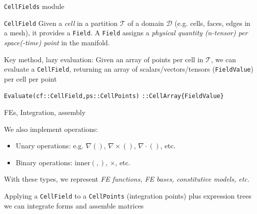 \begin{frame}{\texttt{CellFields} module}


\begin{block}{\texttt{CellField}}
  Given a \emph{cell} in a partition $\mathcal{T}$ of a domain $\mathcal{D}$ (e.g. cells, faces, edges in a mesh), it provides a \texttt{Field}. A \texttt{Field} assigns a \emph{physical quantity (n-tensor) per space(-time) point} in the manifold.

\end{block}

Key method, lazy evaluation: Given an array of points per cell in $\mathcal{T}$, we can evaluate a \texttt{CellField}, returning an array of scalars/vectors/tensors (\texttt{FieldValue}) per cell per point

  \texttt{Evaluate(cf::CellField,ps::CellPoints)}
  \texttt{::CellArray\{FieldValue\}}




\end{frame}

\begin{frame}{FEs, Integration, assembly}


We also implement operations:

\begin{itemize}
\item Unary operations: e.g. $\nabla()$, $\nabla\times()$, $\nabla \cdot()$, etc.
\item Binary operations: inner$(,)$, $\times$, etc.
\end{itemize}

With these types, we represent \emph{FE functions, FE bases, constitutive models, etc.}

Applying a \texttt{CellField} to a \texttt{CellPoints} (integration points) plus expression trees we can integrate forms and assemble matrices

\pause

{\large \color{red}{Let us look at Gridap Tutorial 1} }

\end{frame}

%
%
%
%
%
%

